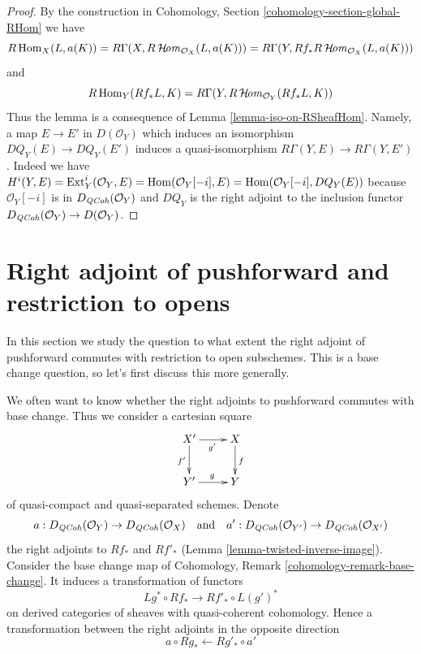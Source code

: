 \begin{proof}
By the construction in
Cohomology, Section \ref{cohomology-section-global-RHom}
we have
$$
R\mathop{\mathrm{Hom}}\nolimits_X(L, a(K)) =
R\Gamma(X, R\mathop{\mathcal{H}\!\mathit{om}}\nolimits_{\mathcal{O}_X}(L, a(K))) =
R\Gamma(Y, Rf_*R\mathop{\mathcal{H}\!\mathit{om}}\nolimits_{\mathcal{O}_X}(L, a(K)))
$$
and
$$
R\mathop{\mathrm{Hom}}\nolimits_Y(Rf_*L, K) = R\Gamma(Y, R\mathop{\mathcal{H}\!\mathit{om}}\nolimits_{\mathcal{O}_Y}(Rf_*L, K))
$$
Thus the lemma is a consequence of Lemma \ref{lemma-iso-on-RSheafHom}.
Namely, a map $E \to E'$ in $D(\mathcal{O}_Y)$ which induces
an isomorphism $DQ_Y(E) \to DQ_Y(E')$ induces a quasi-isomorphism
$R\Gamma(Y, E) \to R\Gamma(Y, E')$. Indeed we have
$H^i(Y, E) = \mathop{\mathrm{Ext}}\nolimits^i_Y(\mathcal{O}_Y, E) = \mathop{\mathrm{Hom}}\nolimits(\mathcal{O}_Y[-i], E) =
\mathop{\mathrm{Hom}}\nolimits(\mathcal{O}_Y[-i], DQ_Y(E))$ because $\mathcal{O}_Y[-i]$
is in $D_{\mathit{QCoh}}(\mathcal{O}_Y)$ and $DQ_Y$ is the right adjoint
to the inclusion functor $D_{\mathit{QCoh}}(\mathcal{O}_Y) \to D(\mathcal{O}_Y)$.
\end{proof}







\section{Right adjoint of pushforward and restriction to opens}
\label{section-restriction-to-opens}

\noindent
In this section we study the question to what extent the right adjoint
of pushforward commutes with restriction to open subschemes. This is
a base change question, so let's first discuss this more generally.

\medskip\noindent
We often want to know whether the right adjoints to pushforward commutes
with base change. Thus we consider a cartesian square
\begin{equation}
\label{equation-base-change}
\vcenter{
\xymatrix{
X' \ar[r]_{g'} \ar[d]_{f'} & X \ar[d]^f \\
Y' \ar[r]^g & Y
}
}
\end{equation}
of quasi-compact and quasi-separated schemes.
Denote
$$
a  : D_{\mathit{QCoh}}(\mathcal{O}_Y) \to D_{\mathit{QCoh}}(\mathcal{O}_X)
\quad\text{and}\quad
a'  : D_{\mathit{QCoh}}(\mathcal{O}_{Y'}) \to D_{\mathit{QCoh}}(\mathcal{O}_{X'})
$$
the right adjoints to $Rf_*$ and $Rf'_*$
(Lemma \ref{lemma-twisted-inverse-image}).
Consider the base change map of
Cohomology, Remark \ref{cohomology-remark-base-change}.
It induces a transformation of functors
$$
Lg^* \circ Rf_* \longrightarrow Rf'_* \circ L(g')^*
$$
on derived categories of sheaves with quasi-coherent cohomology.
Hence a transformation between the right adjoints in the opposite direction
$$
a \circ Rg_* \longleftarrow Rg'_* \circ a'
$$

